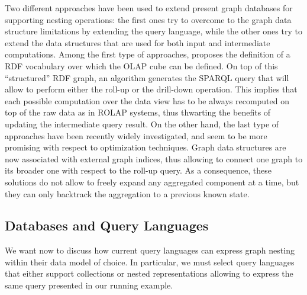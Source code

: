  Two different approaches have been used to extend present graph databases for supporting nesting operations:
the first ones try to overcome to the graph data structure limitations by extending the query language, while the other ones try to extend the data structures that are used for both input and intermediate computations. Among the first type of approaches, \cite{Etcheverry2012} proposes the definition of a RDF  vocabulary over which the OLAP  cube can be defined. On top of this ``structured'' RDF graph, an algorithm generates the SPARQL query that will allow to perform either the roll-up or the drill-down operation. This implies that each possible computation over the data view has to be always recomputed on top of the raw data as in ROLAP systems, thus thwarting the benefits of updating the intermediate query result. On the other hand, the last type of approaches have been recently widely investigated, and seem to be more promising with respect to optimization techniques. Graph data structures are now \cite{Tian20085,ChenYZHY08,Qu2011} associated with external graph indices, thus allowing to connect one graph to its broader one with respect to the roll-up query. As a consequence, these solutions do not allow to freely expand any aggregated component at a time, but they can only backtrack the aggregation to a previous known state. %


\subsection{Databases and Query Languages}\label{subsec:pathsumm}
We want now to discuss how current query languages can express graph nesting  within their data model of choice. In particular, we must select query languages that either support collections or nested representations allowing to express the same query presented in our running example. 

